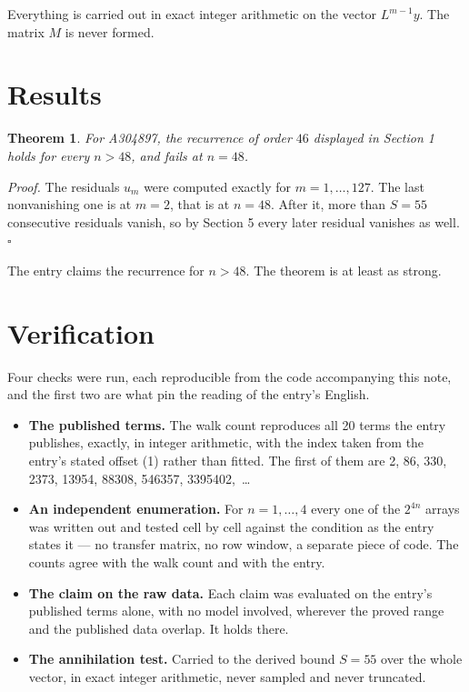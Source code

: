 \documentclass[11pt]{article}
\newtheorem{theorem}{Theorem}
\theoremstyle{definition}
\begin{document}
Everything is carried out in exact integer arithmetic on the vector $L^{m-1}y$. The matrix $M$ is never formed.

\section{Results}

\begin{theorem} For A304897, the recurrence of order $46$ displayed in Section 1 holds for every $n > 48$, and fails at $n = 48$.\end{theorem}

{\itshape Proof.} The residuals $u_m$ were computed exactly for $m = 1,\dots,127$. The last nonvanishing one is at $m = 2$, that is at $n = 48$. After it, more than $S = 55$ consecutive residuals vanish, so by Section 5 every later residual vanishes as well. $\square$

The entry claims the recurrence for $n > 48$. The theorem is at least as strong.

\section{Verification}

Four checks were run, each reproducible from the code accompanying this note, and the first two are what pin the reading of the entry's English.

\begin{itemize}

\item {\bfseries The published terms.} The walk count reproduces all 20 terms the entry publishes, exactly, in integer arithmetic, with the index taken from the entry's stated offset (1) rather than fitted. The first of them are 2, 86, 330, 2373, 13954, 88308, 546357, 3395402,~\dots

\item {\bfseries An independent enumeration.} For $n = 1,\dots,4$ every one of the $2^{4n}$ arrays was written out and tested cell by cell against the condition as the entry states it --- no transfer matrix, no row window, a separate piece of code. The counts agree with the walk count and with the entry.

\item {\bfseries The claim on the raw data.} Each claim was evaluated on the entry's published terms alone, with no model involved, wherever the proved range and the published data overlap. It holds there.

\item {\bfseries The annihilation test.} Carried to the derived bound $S = 55$ over the whole vector, in exact integer arithmetic, never sampled and never truncated.

\end{itemize}
\end{document}
